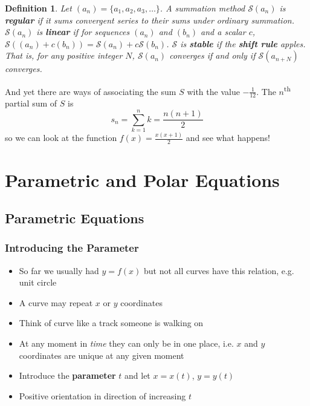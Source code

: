 \documentclass[letterpaper, 11pt, openany]{book}
\theoremstyle{mytheoremstyle}
\newtheorem{definition}{Definition}[section]
\theoremstyle{myexamplestyle}
\begin{document}
\begin{definition}\label{d:summation-props}
    Let \((a_{n}) = \{a_{1}, a_{2}, a_{3},\ldots\}\). A summation method \(\mathcal{S}(a_{n})\) is \textbf{regular} if it sums convergent series to their sums under ordinary summation. \(\mathcal{S}(a_{n})\) is \textbf{linear} if for sequences \((a_{n})\) and \((b_{n})\) and a scalar \(c\), \(\mathcal{S}((a_{n}) + c(b_{n})) = \mathcal{S}(a_{n}) + c\mathcal{S}(b_{n})\). \(\mathcal{S}\) is \textbf{stable} if the \textbf{shift rule} apples. That is, for any positive integer \(N\), \(\mathcal{S}(a_{n})\) converges if and only if \(\mathcal{S}(a_{n+N})\) converges.
\end{definition}

And yet there are ways of associating the sum \(S\) with the value \(-\frac{1}{12}\). The \(n\)\textsuperscript{th} partial sum of \(S\) is
\[s_{n} = \sum_{k=1}^{n} k = \frac{n(n+1)}{2}\]
so we can look at the function \(f(x) = \frac{x(x+1)}{2}\) and see what happens!

\newpage\thispagestyle{firstofchapter}
\chapter{Parametric and Polar Equations}
\section{Parametric Equations}
\setcounter{figure}{0}
\subsection{Introducing the Parameter}

\begin{itemize}
    \item So far we usually had $y = f(x)$ but not all curves have this relation, e.g. unit circle
    \item A curve may repeat $x$ or $y$ coordinates
    \item Think of curve like a track someone is walking on
    \item At any moment in \textit{time} they can only be in one place, i.e. $x$ and $y$ coordinates are unique at any given moment
    \item Introduce the \textbf{parameter} $t$ and let $x = x(t)$, $y = y(t)$
    \item Positive orientation in direction of increasing $t$
\end{itemize}
\end{document}
